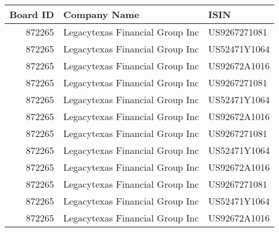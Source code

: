 

\begin{longtable}{ r l l }\hline\hline
   Board ID &    Company Name &    ISIN\\ 
\hline\endhead
   872265 &    Legacytexas Financial Group Inc &    US9267271081\\ 
   872265 &    Legacytexas Financial Group Inc &    US52471Y1064\\ 
   872265 &    Legacytexas Financial Group Inc &    US92672A1016\\ 
   872265 &    Legacytexas Financial Group Inc &    US9267271081\\ 
   872265 &    Legacytexas Financial Group Inc &    US52471Y1064\\ 
   872265 &    Legacytexas Financial Group Inc &    US92672A1016\\ 
   872265 &    Legacytexas Financial Group Inc &    US9267271081\\ 
   872265 &    Legacytexas Financial Group Inc &    US52471Y1064\\ 
   872265 &    Legacytexas Financial Group Inc &    US92672A1016\\ 
   872265 &    Legacytexas Financial Group Inc &    US9267271081\\ 
   872265 &    Legacytexas Financial Group Inc &    US52471Y1064\\ 
   872265 &    Legacytexas Financial Group Inc &    US92672A1016\\ 
\hline\hline\end{longtable}

